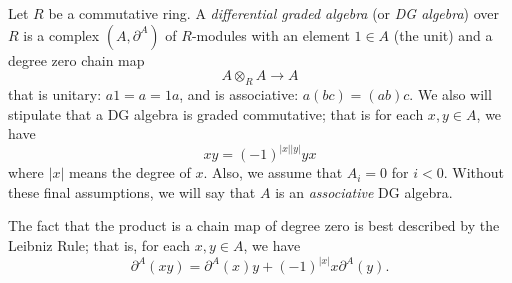 \documentclass[12pt]{article}
\newcommand{\del}{\ensuremath{\partial}}
\begin{document}
Let $R$ be a commutative ring.  A \emph{differential graded algebra} (or \emph{DG algebra}) over $R$ is a complex $(A,\del^A)$ of $R$-modules with an element $1 \in A$ (the unit) and a degree zero chain map
$$A \otimes_R A \to A$$
that is unitary: $a1 = a = 1a$, and is associative: $a(bc) = (ab)c$.  We also will stipulate that a DG algebra is graded commutative; that is for each $x,y \in A$, we have
$$xy = (-1)^{|x||y|}yx$$
where $|x|$ means the degree of $x$.  Also, we assume that $A_i = 0$ for $i < 0$.    Without these final assumptions, we will say that $A$ is an \emph{associative} DG algebra.

The fact that the product is a chain map of degree zero is best described by the Leibniz Rule; that is, for each $x,y \in A$, we have
$$\del^A(xy) = \del^A(x)y + (-1)^{|x|}x\del^A(y).$$
\end{document}
